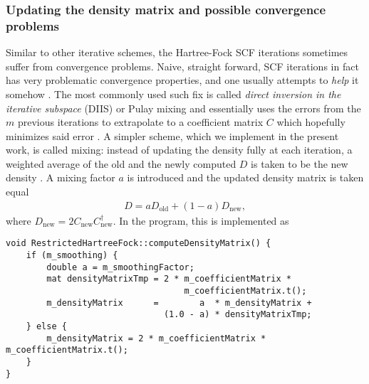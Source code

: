 \documentclass[../../master.tex]{subfiles}
\begin{document}
\subsubsection{Updating the density matrix and possible convergence problems}
Similar to other iterative schemes, the Hartree-Fock SCF iterations sometimes suffer from convergence problems. Naive, straight forward, SCF iterations in fact has very problematic convergence properties, and one usually attempts to \emph{help} it somehow \cite{kvaal}. The most commonly used such fix is called \emph{direct inversion in the iterative subspace} (DIIS) or Pulay mixing and essentially uses the errors from the $m$ previous iterations to extrapolate to a coefficient matrix $C$ which hopefully minimizes said error \cite{pulay}. A simpler scheme, which we implement in the present work, is called mixing: instead of updating the density fully at each iteration, a weighted average of the old and the newly computed $D$ is taken to be the new density \cite{thijssen}. A mixing factor $a$ is introduced and the updated density matrix is taken equal 
\begin{align}
D=aD_\text{old}+(1-a)D_\text{new},
\end{align}
where $D_\text{new}=2C_\text{new}C_{\text{new}}^\dagger$. In the program, this is implemented as
\begin{lstlisting}[language={[std]c++}]
void RestrictedHartreeFock::computeDensityMatrix() {
    if (m_smoothing) {
        double a = m_smoothingFactor;
        mat densityMatrixTmp = 2 * m_coefficientMatrix *
                                   m_coefficientMatrix.t();
        m_densityMatrix      =        a  * m_densityMatrix + 
                               (1.0 - a) * densityMatrixTmp;
    } else {
        m_densityMatrix = 2 * m_coefficientMatrix * m_coefficientMatrix.t();
    }
}
\end{lstlisting}




%
%
%
%
%
\end{document}
